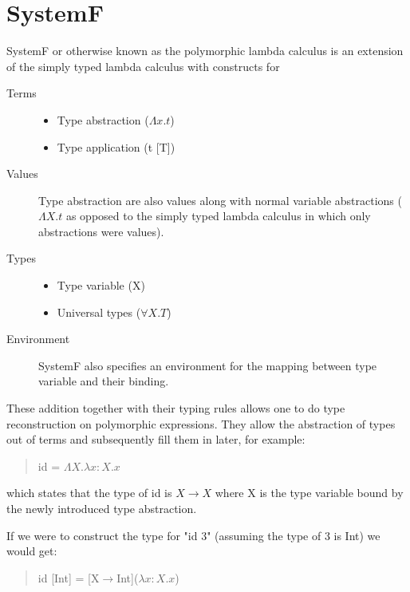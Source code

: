 \documentclass[twoside, titlepage, openright, a4paper]{book}
\begin{document}
\section{SystemF}
SystemF or otherwise known as the polymorphic lambda calculus is an extension of the simply typed lambda calculus with constructs for

\begin{description}
\item[Terms]{
	\begin{minipage}[t]{\linewidth}
		\begin{itemize}
			\item Type abstraction ($\Lambda x.t$)
			\item Type application (t [T])
		\end{itemize}
	\end{minipage}
}
\item[Values] Type abstraction are also values along with normal variable abstractions ($\Lambda X.t$ as opposed to the simply typed lambda calculus in which only abstractions were values).
\item[Types]{ 
	\begin{minipage}[t]{\linewidth}
		\begin{itemize}
			\item Type variable (X)
			\item Universal types ($\forall X. T$)
		\end{itemize}
	\end{minipage}
}
\item[Environment] SystemF also specifies an environment for the mapping between type variable and their binding.
\end{description}

These addition together with their typing rules allows one to do type reconstruction on polymorphic expressions. They allow the abstraction of types out of terms and subsequently fill them in later, for example:
\begin{quotation}
id = $\Lambda X.\lambda x:X. x$
\end{quotation}
which states that the type of id is $X \rightarrow X$ where X is the type variable bound by the newly introduced type abstraction. 

If we were to construct the type for "id 3" (assuming the type of 3 is Int) we would get:

\begin{quotation}
id [Int] = [X$\rightarrow$Int]($\lambda x:X. x$)
\end{quotation}
\end{document}
